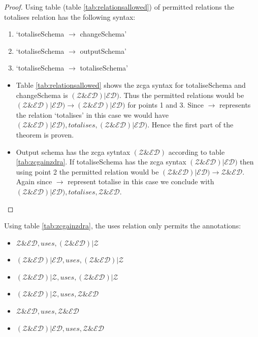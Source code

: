 \begin{proof}
Using table (table \ref{tab:relationsallowed}) of permitted relations the totalises relation has the following syntax:
\begin{enumerate}
\item `totaliseSchema $\longrightarrow$ changeSchema'
\item `totaliseSchema $\longrightarrow$ outputSchema'
\item `totaliseSchema $\longrightarrow$ totaliseSchema'
\end{enumerate} 

\begin{itemize}
\item Table \ref{tab:relationsallowed} shows the \gls{zcga} syntax for totaliseSchema and changeSchema is $(\mathcal{Z} \& \mathcal{ED}) | \mathcal{ED})$. Thus the permitted relations would be $(\mathcal{Z} \& \mathcal{ED}) | \mathcal{ED}) \longrightarrow (\mathcal{Z} \& \mathcal{ED}) | \mathcal{ED})$ for points 1 and 3. Since $\longrightarrow$ represents the relation `totalises' in this case we would have $(\mathcal{Z} \& \mathcal{ED}) | \mathcal{ED}), totalises, (\mathcal{Z} \& \mathcal{ED}) | \mathcal{ED})$. Hence the first part of the theorem is proven.

\item Output schema has the \gls{zcga} sytntax $(\mathcal{Z} \& \mathcal{ED})$ according to table \ref{tab:zcgainzdra}. If totaliseSchema has the \gls{zcga} syntax $(\mathcal{Z} \& \mathcal{ED}) | \mathcal{ED})$ then using point 2 the permitted relation would be $(\mathcal{Z} \& \mathcal{ED}) | \mathcal{ED}) \longrightarrow \mathcal{Z} \& \mathcal{ED}$. Again since $\longrightarrow$ represent totalise in this case we conclude with $(\mathcal{Z} \& \mathcal{ED}) | \mathcal{ED}), totalises, \mathcal{Z} \& \mathcal{ED}$.
\end{itemize}
\end{proof}

\begin{thm}
Using table \ref{tab:zcgainzdra}, the uses relation only permits the annotations:
\begin{itemize}
\item $\mathcal{Z} \& \mathcal{ED}, uses, (\mathcal{Z} \& \mathcal{ED}) | \mathcal{Z}$
\item $(\mathcal{Z} \& \mathcal{ED}) | \mathcal{ED}, uses, (\mathcal{Z} \& \mathcal{ED}) | \mathcal{Z}$
\item $(\mathcal{Z} \& \mathcal{ED}) | \mathcal{Z}, uses, (\mathcal{Z} \& \mathcal{ED}) | \mathcal{Z}$
\item $(\mathcal{Z} \& \mathcal{ED}) | \mathcal{Z}, uses, \mathcal{Z} \& \mathcal{ED}$
\item $\mathcal{Z} \& \mathcal{ED}, uses, \mathcal{Z} \& \mathcal{ED}$
\item $(\mathcal{Z} \& \mathcal{ED}) | \mathcal{ED}, uses, \mathcal{Z} \& \mathcal{ED}$
\end{itemize}
\end{thm}

